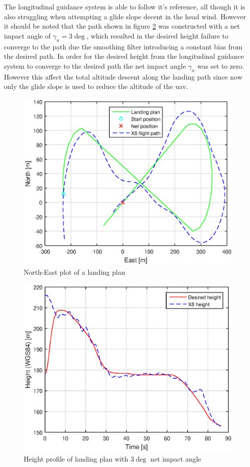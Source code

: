 The longitudinal guidance system is able to follow it's reference, all though it is also struggling when attempting a glide slope decent in the head wind. However it  should be noted that the path shown in figure \ref{Fig:Height31mai103029} was constructed with a net impact angle of $\gamma_n = 3 \deg$, which resulted in the desired height failure to converge to the path due the smoothing filter introducing a constant bias from the desired path. In order for the desired height from the longitudinal guidance system to converge to the desired path the net impact angle $\gamma_n$ was set to zero. However this affect the total altitude descent along the landing path since now only the glide slope is used to reduce the altitude of the \gls{uav}. 
\newpage
\begin{figure}[H]
	\centering
		\includegraphics[scale=0.7]{figs/Experiment/NorthEast31mai103029.eps}
		\caption{North-East plot of a landing plan}
		\label{Fig:NorthEast31mai103029}
\end{figure}
\begin{figure}[H]
\centering
		\includegraphics[scale=0.7]{figs/Experiment/Height31mai103029.eps}
		\caption{Height profile of landing plan with $3 \deg$ net impact angle}
		\label{Fig:Height31mai103029}
\end{figure}
